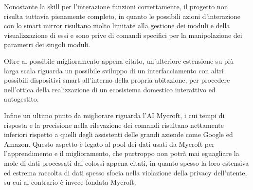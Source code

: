 \documentclass[12pt,a4paper]{article}
\begin{document}
Nonostante la skill per l'interazione funzioni correttamente, il progetto non risulta tuttavia pienamente
completo, in quanto le possibili azioni d'interazione con lo smart mirror risultano molto limitate
alla gestione dei moduli e della visualizzazione di essi e sono prive di comandi specifici per la
manipolazione dei parametri dei singoli moduli.

Oltre al possibile miglioramento appena citato, un'ulteriore estensione su pi\`u larga scala riguarda
un possibile sviluppo di un interfacciamento con altri possibili dispositivi smart all'interno
della propria abitazione, per procedere nell'ottica della realizzazione di un ecosistema domestico
interattivo ed autogestito.

Infine un ultimo punto da migliorare riguarda l'AI Mycroft, i cui tempi di risposta e la precisione nella
rilevazione dei comandi risultano nettamente inferiori rispetto a quelli degli assistenti delle grandi aziende
come Google ed Amazon. Questo aspetto \`e legato al pool dei dati usati da Mycroft per l'apprendimento e il 
miglioramento, che purtroppo non potr\`a mai eguagliare la mole di dati processati dai colossi appena
citati, in quanto spesso la loro estensiva ed estrema raccolta di dati spesso sfocia nella violazione della
privacy dell'utente, su cui al contrario \`e invece fondata Mycroft.

\newpage
\printbibliography
\end{document}
